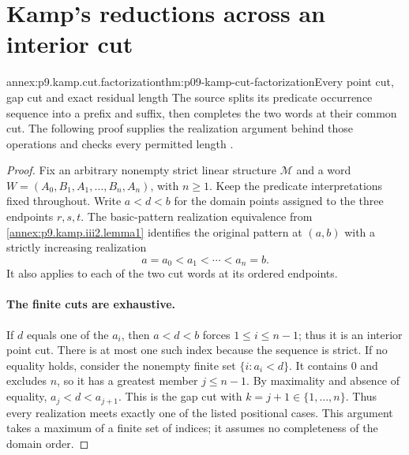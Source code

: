 
\section{Kamp's reductions across an interior cut}
\label{sec:annex-p09-kamp-iii2-lemma7}

\begin{annexitem}{annex:p9.kamp.cut.factorization}{thm:p09-kamp-cut-factorization}{Every point cut, gap cut and exact residual length}
The source splits its predicate occurrence sequence into a prefix and
suffix, then completes the two words at their common cut. The following
proof supplies the realization argument behind those operations and
checks every permitted length
\cite[ch.~III, pp.~64--66, 81--82]{Kamp1968}.

\begin{proof}
Fix an arbitrary nonempty strict linear structure \(\mathcal M\)
and a word \(W=(A_0,B_1,A_1,\ldots,B_n,A_n)\), with \(n\geq1\).
Keep the predicate interpretations fixed throughout. Write \(a<d<b\)
for the domain points assigned to the three endpoints \(r,s,t\).
The basic-pattern realization equivalence from
\cref{annex:p9.kamp.iii2.lemma1} identifies the original pattern
at \((a,b)\) with a strictly increasing realization
\[
                         a=a_0<a_1<\cdots<a_n=b.
\]
It also applies to each of the two cut words at its ordered endpoints.

\paragraph{The finite cuts are exhaustive.}
If \(d\) equals one of the \(a_i\), then \(a<d<b\)
forces \(1\leq i\leq n-1\); thus it is an interior point
cut. There is at most one such index because the sequence is strict.
If no equality holds, consider the nonempty finite set
\(\{i:a_i<d\}\). It contains 0 and excludes \(n\), so it
has a greatest member \(j\leq n-1\). By maximality and absence
of equality, \(a_j<d<a_{j+1}\). This is the gap cut with
\(k=j+1\in\{1,\ldots,n\}\). Thus every realization meets
exactly one of the listed positional cases. This argument takes a
maximum of a finite set of indices; it assumes no completeness of
the domain order.


\end{proof}
\end{annexitem}
